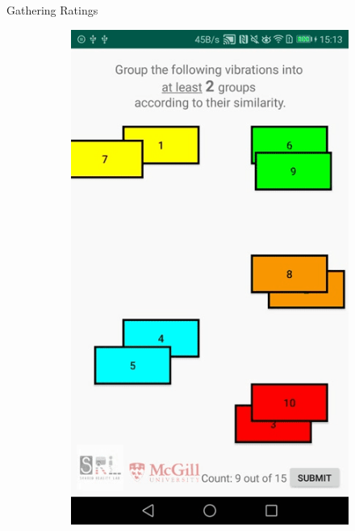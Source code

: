 \begin{frame}{Gathering Ratings}
\begin{figure}[!htb]
\begin{subfigure}{.24\textwidth}
  \includegraphics[width=\linewidth]{Images/3.png}
\end{subfigure}
\begin{subfigure}{.24\textwidth}
  \centering
  \label{fig:app_process_grouping_4}

\end{subfigure}
\end{figure}
\end{frame}
